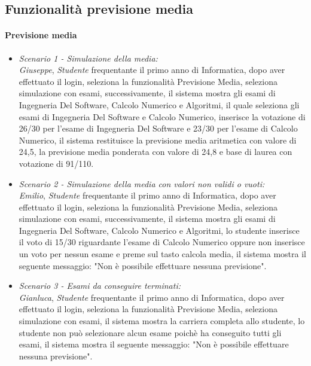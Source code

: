 \clearpage

\subsection{Funzionalità previsione media}

\paragraph{Previsione media\\}
\begin{itemize}
	\item \textit{Scenario 1 - Simulazione della media:\\}
	\textit {Giuseppe}, \textit {Studente} frequentante il primo anno di Informatica, dopo aver effettuato il login, seleziona la funzionalità Previsione Media, seleziona simulazione con esami, successivamente, il sistema mostra gli esami di Ingegneria Del Software, Calcolo Numerico e Algoritmi, il quale seleziona gli esami di Ingegneria Del Software e Calcolo Numerico, inserisce la votazione di 26/30 per l'esame di Ingegneria Del Software e 23/30 per l'esame di Calcolo Numerico, il sistema restituisce la previsione media aritmetica con valore di 24,5, la previsione media ponderata con valore di 24,8 e base di laurea con votazione di 91/110.\\
\end{itemize}

\begin{itemize}
	\item \textit{Scenario 2 - Simulazione della media con valori non validi o vuoti:\\}
	\textit {Emilio}, \textit {Studente} frequentante il primo anno di Informatica, dopo aver effettuato il login, seleziona la funzionalità Previsione Media, seleziona simulazione con esami, successivamente, il sistema mostra gli esami di Ingegneria Del Software, Calcolo Numerico e Algoritmi, lo studente inserisce il voto di 15/30 riguardante l'esame di Calcolo Numerico oppure non inserisce un voto per nessun esame e preme sul tasto calcola media, il sistema mostra il seguente messaggio: "Non è possibile effettuare nessuna previsione".\\
\end{itemize}

\begin{itemize}
	\item \textit{Scenario 3 - Esami da conseguire terminati:\\}
	\textit {Gianluca}, \textit {Studente} frequentante il primo anno di Informatica, dopo aver effettuato il login, seleziona la funzionalità Previsione Media, seleziona simulazione con esami, il sistema mostra la carriera completa allo studente, lo studente non può selezionare alcun esame poichè ha conseguito tutti gli esami, il sistema mostra il seguente messaggio: "Non è possibile effettuare nessuna previsione".\\
\end{itemize}

